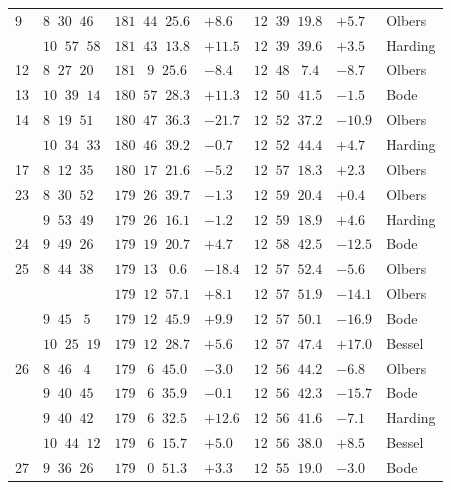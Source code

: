 \begin{longtable}{l|l|l|l|l|l|l}
9       & $8\;\;30\;\;46$ & $181\;\;44\;\;25.6$ & $+8.6$ & $12\;\;39\;\;19.8$ & $+5.7$ & Olbers \\
        & $10\;\;57\;\;58$ & $181\;\;43\;\;13.8$ & $+11.5$ & $12\;\;39\;\;39.6$ & $+3.5$ & Harding \\
12      & $8\;\;27\;\;20$ & $181\;\;\;9\;\;25.6$ & $-8.4$ & $12\;\;48\;\;\;7.4$ & $-8.7$ & Olbers \\
13      & $10\;\;39\;\;14$ & $180\;\;57\;\;28.3$ & $+11.3$ & $12\;\;50\;\;41.5$ & $-1.5$ & Bode \\
14      & $8\;\;19\;\;51$ & $180\;\;47\;\;36.3$ & $-21.7$ & $12\;\;52\;\;37.2$ & $-10.9$ & Olbers \\
        & $10\;\;34\;\;33$ & $180\;\;46\;\;39.2$ & $-0.7$ & $12\;\;52\;\;44.4$ & $+4.7$ & Harding \\
17      & $8\;\;12\;\;35$ & $180\;\;17\;\;21.6$ & $-5.2$ & $12\;\;57\;\;18.3$ & $+2.3$ & Olbers \\
23      & $8\;\;30\;\;52$ & $179\;\;26\;\;39.7$ & $-1.3$ & $12\;\;59\;\;20.4$ & $+0.4$ & Olbers \\
        & $9\;\;53\;\;49$ & $179\;\;26\;\;16.1$ & $-1.2$ & $12\;\;59\;\;18.9$ & $+4.6$ & Harding \\
24      & $9\;\;49\;\;26$ & $179\;\;19\;\;20.7$ & $+4.7$ & $12\;\;58\;\;42.5$ & $-12.5$ & Bode \\
25      & $8\;\;44\;\;38$ & $179\;\;13\;\;\;0.6$ & $-18.4$ & $12\;\;57\;\;52.4$ & $-5.6$ & Olbers \\
        & & $179\;\;12\;\;57.1$ & $+8.1$ & $12\;\;57\;\;51.9$ & $-14.1$ & Olbers \\
        & $9\;\;45\;\;\;5$ & $179\;\;12\;\;45.9$ & $+9.9$ & $12\;\;57\;\;50.1$ & $-16.9$ & Bode \\
        & $10\;\;25\;\;19$ & $179\;\;12\;\;28.7$ & $+5.6$ & $12\;\;57\;\;47.4$ & $+17.0$ & Bessel \\
26      & $8\;\;46\;\;\;4$ & $179\;\;\;6\;\;45.0$ & $-3.0$ & $12\;\;56\;\;44.2$ & $-6.8$ & Olbers \\
        & $9\;\;40\;\;45$ & $179\;\;\;6\;\;35.9$ & $-0.1$ & $12\;\;56\;\;42.3$ & $-15.7$ & Bode \\
        & $9\;\;40\;\;42$ & $179\;\;\;6\;\;32.5$ & $+12.6$ & $12\;\;56\;\;41.6$ & $-7.1$ & Harding \\
        & $10\;\;44\;\;12$ & $179\;\;\;6\;\;15.7$ & $+5.0$ & $12\;\;56\;\;38.0$ & $+8.5$ & Bessel \\
27      & $9\;\;36\;\;26$ & $179\;\;\;0\;\;51.3$ & $+3.3$ & $12\;\;55\;\;19.0$ & $-3.0$ & Bode \\

\end{longtable}

